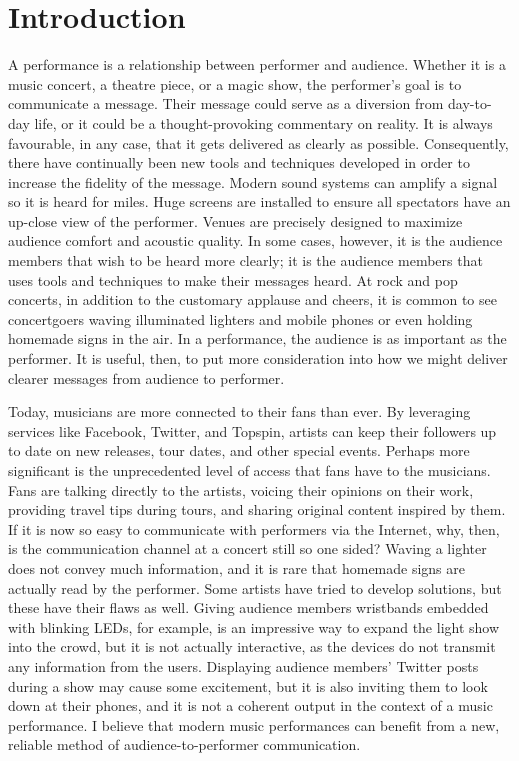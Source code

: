 \chapter{Introduction}

A performance is a relationship between performer and audience. Whether it is a music concert, a theatre piece, or a magic show, the performer's goal is to communicate a message. Their message could serve as a diversion from day-to-day life, or it could be a thought-provoking commentary on reality. It is always favourable, in any case, that it gets delivered as clearly as possible. Consequently, there have continually been new tools and techniques developed in order to increase the fidelity of the message. Modern sound systems can amplify a signal so it is heard for miles. Huge screens are installed to ensure all spectators have an up-close view of the performer. Venues are precisely designed to maximize audience comfort and acoustic quality. In some cases, however, it is the audience members that wish to be heard more clearly; it is the audience members that uses tools and techniques to make their messages heard. At rock and pop concerts, in addition to the customary applause and cheers, it is common to see concertgoers waving illuminated lighters and mobile phones or even holding homemade signs in the air. In a performance, the audience is as important as the performer. It is useful, then, to put more consideration into how we might deliver clearer messages from audience to performer.

Today, musicians are more connected to their fans than ever. By leveraging services like Facebook, Twitter, and Topspin, artists can keep their followers up to date on new releases, tour dates, and other special events. Perhaps more significant is the unprecedented level of access that fans have to the musicians. Fans are talking directly to the artists, voicing their opinions on their work, providing travel tips during tours, and sharing original content inspired by them. If it is now so easy to communicate with performers via the Internet, why, then, is the communication channel at a concert still so one sided? Waving a lighter does not convey much information, and it is rare that homemade signs are actually read by the performer. Some artists have tried to develop solutions, but these have their flaws as well. Giving audience members wristbands embedded with blinking LEDs, for example, is an impressive way to expand the light show into the crowd, but it is not actually interactive, as the devices do not transmit any information from the users. Displaying audience members' Twitter posts during a show may cause some excitement, but it is also inviting them to look down at their phones, and it is not a coherent output in the context of a music performance. I believe that modern music performances can benefit from a new, reliable method of audience-to-performer communication.

